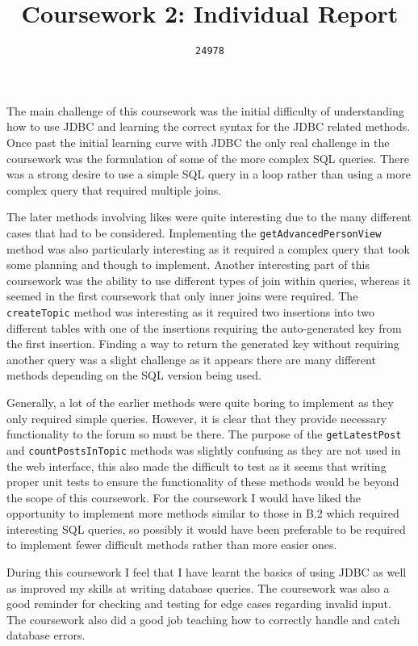\documentclass{article}
\begin{document}
\author{
	\texttt{24978}
}
\title{Coursework 2: Individual Report}
\maketitle

The main challenge of this coursework was the initial difficulty of understanding how to use JDBC and learning the correct syntax for the JDBC related methods. Once past the initial learning curve with JDBC the only real challenge in the coursework was the formulation of some of the more complex SQL queries. There was a strong desire to use a simple SQL query in a loop rather than using a more complex query that required multiple joins.

The later methods involving likes were quite interesting due to the many different cases that had to be considered. Implementing the \texttt{getAdvancedPersonView} method was also particularly interesting as it required a complex query that took some planning and though to implement. Another interesting part of this coursework was the ability to use different types of join within queries, whereas it seemed in the first coursework that only inner joins were required. The \texttt{createTopic} method was interesting as it required two insertions into two different tables with one of the insertions requiring the auto-generated key from the first insertion. Finding a way to return the generated key without requiring another query was a slight challenge as it appears there are many different methods depending on the SQL version being used.

Generally, a lot of the earlier methods were quite boring to implement as they only required simple queries. However, it is clear that they provide necessary functionality to the forum so must be there. The purpose of the \texttt{getLatestPost} and \texttt{countPostsInTopic} methods was slightly confusing as they are not used in the web interface, this also made the difficult to test as it seems that writing proper unit tests to ensure the functionality of these methods would be beyond the scope of this coursework. For the coursework I would have liked the opportunity to implement more methods similar to those in B.2 which required interesting SQL queries, so possibly it would have been preferable to be required to implement fewer difficult methods rather than more easier ones.

During this coursework I feel that I have learnt the basics of using JDBC as well as improved my skills at writing database queries. The coursework was also a good reminder for checking and testing for edge cases regarding invalid input. The coursework also did a good job teaching how to correctly handle and catch database errors.
\end{document}
